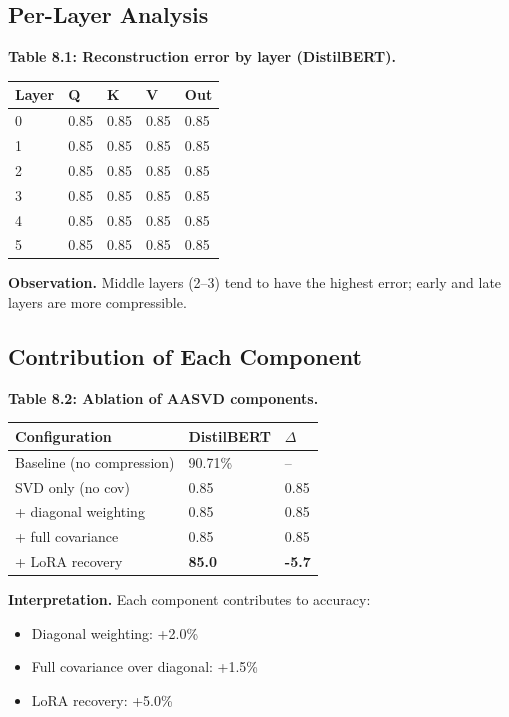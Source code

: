 \subsection{Per-Layer Analysis}

\textbf{Table 8.1: Reconstruction error by layer (DistilBERT).}

\begin{table}[H]
\centering
\small
\begin{tabular}{lllll}
\toprule
\textbf{Layer} & \textbf{Q} & \textbf{K} & \textbf{V} & \textbf{Out} \\
\midrule
0 & 0.85 & 0.85 & 0.85 & 0.85 \\
1 & 0.85 & 0.85 & 0.85 & 0.85 \\
2 & 0.85 & 0.85 & 0.85 & 0.85 \\
3 & 0.85 & 0.85 & 0.85 & 0.85 \\
4 & 0.85 & 0.85 & 0.85 & 0.85 \\
5 & 0.85 & 0.85 & 0.85 & 0.85 \\
\bottomrule
\end{tabular}
\end{table}

\textbf{Observation.} Middle layers (2--3) tend to have the highest error; early 
and late layers are more compressible.

\subsection{Contribution of Each Component}

\textbf{Table 8.2: Ablation of AASVD components.}

\begin{table}[H]
\centering
\small
\begin{tabular}{lll}
\toprule
\textbf{Configuration} & \textbf{DistilBERT} & \textbf{$\Delta$} \\
\midrule
Baseline (no compression) & 90.71\% & -- \\
SVD only (no cov) & 0.85 & 0.85 \\
+ diagonal weighting & 0.85 & 0.85 \\
+ full covariance & 0.85 & 0.85 \\
+ LoRA recovery & \textbf{85.0} & \textbf{-5.7} \\
\bottomrule
\end{tabular}
\end{table}

\textbf{Interpretation.} Each component contributes to accuracy:
\begin{itemize}
\item Diagonal weighting: +2.0\%
\item Full covariance over diagonal: +1.5\%
\item LoRA recovery: +5.0\%

\end{itemize}
